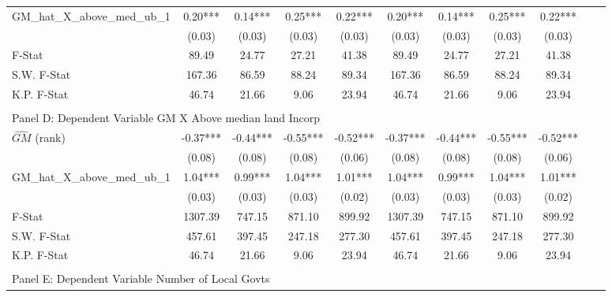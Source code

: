 \begin{table}[htbp]
\begin{threeparttable}
\begin{tabular}{l*{10}{c}}
\addlinespace
GM\_hat\_X\_above\_med\_ub\_1&       0.20***&       0.14***&       0.25***&       0.22***&       0.20***&       0.14***&       0.25***&       0.22***\\
                &     (0.03)   &     (0.03)   &     (0.03)   &     (0.03)   &     (0.03)   &     (0.03)   &     (0.03)   &     (0.03)   \\
\midrule
F-Stat          &      89.49   &      24.77   &      27.21   &      41.38   &      89.49   &      24.77   &      27.21   &      41.38   \\
S.W. F-Stat     &     167.36   &      86.59   &      88.24   &      89.34   &     167.36   &      86.59   &      88.24   &      89.34   \\
K.P. F-Stat     &      46.74   &      21.66   &       9.06   &      23.94   &      46.74   &      21.66   &       9.06   &      23.94   \\
\cmidrule[\heavyrulewidth](lr){1-9} \\ \cmidrule[\heavyrulewidth](lr){1-9}
\multicolumn{8}{l}{Panel D: Dependent Variable GM X Above median land Incorp}\\
\cmidrule(lr){1-9}
$\hat{GM}$ (rank)&      -0.37***&      -0.44***&      -0.55***&      -0.52***&      -0.37***&      -0.44***&      -0.55***&      -0.52***\\
                &     (0.08)   &     (0.08)   &     (0.08)   &     (0.06)   &     (0.08)   &     (0.08)   &     (0.08)   &     (0.06)   \\
\addlinespace
GM\_hat\_X\_above\_med\_ub\_1&       1.04***&       0.99***&       1.04***&       1.01***&       1.04***&       0.99***&       1.04***&       1.01***\\
                &     (0.03)   &     (0.03)   &     (0.03)   &     (0.02)   &     (0.03)   &     (0.03)   &     (0.03)   &     (0.02)   \\
\midrule
F-Stat          &    1307.39   &     747.15   &     871.10   &     899.92   &    1307.39   &     747.15   &     871.10   &     899.92   \\
S.W. F-Stat     &     457.61   &     397.45   &     247.18   &     277.30   &     457.61   &     397.45   &     247.18   &     277.30   \\
K.P. F-Stat     &      46.74   &      21.66   &       9.06   &      23.94   &      46.74   &      21.66   &       9.06   &      23.94   \\
\cmidrule[\heavyrulewidth](lr){1-9} \\ \cmidrule[\heavyrulewidth](lr){1-9}
\multicolumn{8}{l}{Panel E: Dependent Variable Number of Local Govts}\\

\end{tabular}
\end{threeparttable}
\end{table}
